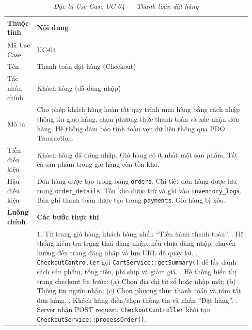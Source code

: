 \documentclass[11pt, a4paper]{article}
\begin{document}
\begin{table}[H]
    \centering
    \small
    \setlength{\tabcolsep}{2pt}
    \renewcommand{\arraystretch}{2.0}
    \caption{\textit{Đặc tả Use Case UC-04 --- Thanh toán đặt hàng}}
    \vspace{0.3cm}
    \begin{tabularx}{\linewidth}{|>{\raggedright\arraybackslash}p{3.3cm}|Y|}
        \hline
        \textbf{Thuộc tính} & \textbf{Nội dung} \\ \hline
        Mã Use Case & UC-04 \\ \hline
        Tên & Thanh toán đặt hàng (Checkout) \\ \hline
        Tác nhân chính & Khách hàng (đã đăng nhập) \\ \hline
        Mô tả & Cho phép khách hàng hoàn tất quy trình mua hàng bằng cách nhập thông tin giao hàng, chọn phương thức thanh toán và xác nhận đơn hàng. Hệ thống đảm bảo tính toàn vẹn dữ liệu thông qua PDO Transaction. \\ \hline
        Tiền điều kiện & Khách hàng đã đăng nhập. Giỏ hàng có ít nhất một sản phẩm. Tất cả sản phẩm trong giỏ hàng còn tồn kho. \\ \hline
        Hậu điều kiện & Đơn hàng được tạo trong bảng \texttt{orders}. Chi tiết đơn hàng được lưu trong \texttt{order\_details}. Tồn kho được trừ và ghi vào \texttt{inventory\_logs}. Bản ghi thanh toán được tạo trong \texttt{payments}. Giỏ hàng bị xóa. \\ \hline
        \textbf{Luồng chính} & \textbf{Các bước thực thi} \\ \hline
        & 1. Từ trang giỏ hàng, khách hàng nhấn ``Tiến hành thanh toán''. . Hệ thống kiểm tra trạng thái đăng nhập; nếu chưa đăng nhập, chuyển hướng đến trang đăng nhập và lưu URL để quay lại. . \texttt{CheckoutController} gọi \texttt{CartService::getSummary()} để lấy danh sách sản phẩm, tổng tiền, phí ship và giảm giá. . Hệ thống hiển thị trang checkout ba bước: (a) Chọn địa chỉ từ sổ hoặc nhập mới; (b) Thông tin người nhận; (c) Chọn phương thức thanh toán và tóm tắt đơn hàng. . Khách hàng điền/chọn thông tin và nhấn ``Đặt hàng''. . Server nhận POST request, \texttt{CheckoutController} khởi tạo \texttt{CheckoutService::processOrder()}. \newline

\end{tabularx}
\end{table}
\end{document}
